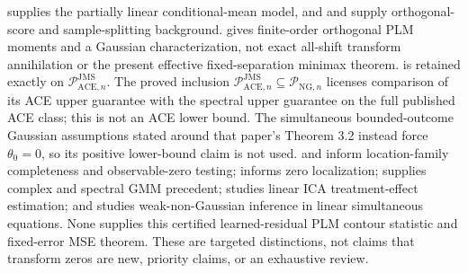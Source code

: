 \cite{Robinson1988} supplies the partially linear conditional-mean model, and \cite{ChernozhukovEtAl2018DML} and \cite{NeweyRobins2018} supply orthogonal-score and sample-splitting background. \cite{MackeySyrgkanisZadik2018} gives finite-order orthogonal PLM moments and a Gaussian characterization, not exact all-shift transform annihilation or the present effective fixed-separation minimax theorem. \cite[Theorem 5.4, condition (21), and bound (22)]{JinMackeySyrgkanis2025} is retained exactly on \(\mathcal P_{\mathrm{ACE},n}^{\mathrm{JMS}}\). The proved inclusion \(\mathcal P_{\mathrm{ACE},n}^{\mathrm{JMS}}\subseteq\mathcal P_{\mathrm{NG},n}\) licenses comparison of its ACE upper guarantee with the spectral upper guarantee on the full published ACE class; this is not an ACE lower bound. The simultaneous bounded-outcome Gaussian assumptions stated around that paper's Theorem 3.2 instead force \(\theta_0=0\), so its positive lower-bound claim is not used. \cite{Mattner1992} and \cite{HuShiu2022} inform location-family completeness and observable-zero testing; \cite{DinhGhoshTranTran2021} informs zero localization; \cite{ChackoViceira2003} supplies complex and spectral GMM precedent; \cite{ReizingerEtAl2025} studies linear ICA treatment-effect estimation; and \cite{LeeMesters2024} studies weak-non-Gaussian inference in linear simultaneous equations. None supplies this certified learned-residual PLM contour statistic and fixed-error MSE theorem. These are targeted distinctions, not claims that transform zeros are new, priority claims, or an exhaustive review.